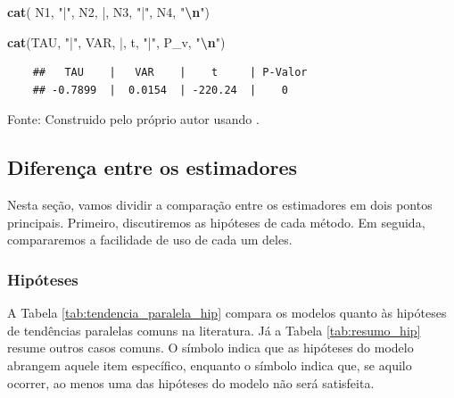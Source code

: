 \documentclass[portugues]{article}
\newcommand{\cmark}{\textcolor{darkgreen}{\ding{51}}} %
\newcommand{\xmark}{\textcolor{darkred}{\ding{55}}} %
\newenvironment{Shaded}{\begin{snugshade}}{\end{snugshade}}
\newcommand{\FunctionTok}[1]{\textcolor[rgb]{0.13,0.29,0.53}{\textbf{#1}}}
\newcommand{\NormalTok}[1]{#1}
\newcommand{\SpecialCharTok}[1]{\textcolor[rgb]{0.81,0.36,0.00}{\textbf{#1}}}
\newcommand{\StringTok}[1]{\textcolor[rgb]{0.31,0.60,0.02}{#1}}
\begin{document}
\begin{box_code}
\begin{Shaded}
\begin{Highlighting}[]
    \FunctionTok{cat}\NormalTok{( N1, }\StringTok{"|"}\NormalTok{, N2, }\StringTok{\textquotesingle{}|\textquotesingle{}}\NormalTok{, N3, }\StringTok{"|"}\NormalTok{, N4,  }\StringTok{"}\SpecialCharTok{\textbackslash{}n}\StringTok{"}\NormalTok{)}
    \end{Highlighting}
    \end{Shaded}

    \begin{Shaded}
    \begin{Highlighting}[]
    \FunctionTok{cat}\NormalTok{(TAU, }\StringTok{"|"}\NormalTok{, VAR, }\StringTok{\textquotesingle{}|\textquotesingle{}}\NormalTok{, t, }\StringTok{"|"}\NormalTok{, P\_v,  }\StringTok{"}\SpecialCharTok{\textbackslash{}n}\StringTok{"}\NormalTok{)}
    \end{Highlighting}
    \end{Shaded}
    
    \begin{verbatim}
    ##   TAU    |   VAR    |    t     | P-Valor
    ## -0.7899  |  0.0154  | -220.24  |    0
    \end{verbatim}
    Fonte: Construido pelo próprio autor usando \cite{borusyak2024revisiting}.
\end{box_code}


\subsection{Diferença entre os estimadores} \label{sec:dif_estimadores}

Nesta seção, vamos dividir a comparação entre os estimadores em dois pontos principais. Primeiro, discutiremos as hipóteses de cada método. Em seguida, compararemos a facilidade de uso de cada um deles.

\subsubsection{Hipóteses}

A Tabela \ref{tab:tendencia_paralela_hip} compara os modelos quanto às hipóteses de tendências paralelas comuns na literatura. Já a Tabela \ref{tab:resumo_hip} resume outros casos comuns. O símbolo \cmark \text{  } indica que as hipóteses do modelo abrangem aquele item específico, enquanto o símbolo \xmark \text{  } indica que, se aquilo ocorrer, ao menos uma das hipóteses do modelo não será satisfeita.

\vspace{5mm}
\end{document}
